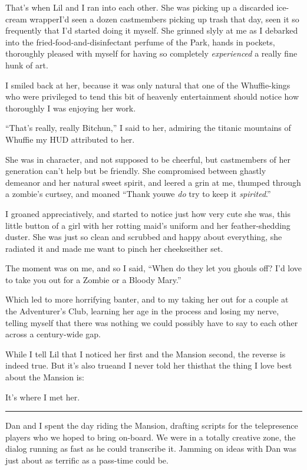 That's when Lil and I ran into each other. She was picking up a
discarded ice-cream wrapper{\dash}I'd seen a dozen castmembers picking up
trash that day, seen it so frequently that I'd started doing it
myself. She grinned slyly at me as I debarked into the
fried-food-and-disinfectant perfume of the Park, hands in pockets,
thoroughly pleased with myself for having so completely
\emph{experienced} a really fine hunk of art.

I smiled back at her, because it was only natural that one of the
Whuffie-kings who were privileged to tend this bit of heavenly
entertainment should notice how thoroughly I was enjoying her
work.

“That's really, really Bitchun,” I said to her, admiring the
titanic mountains of Whuffie my HUD attributed to her.

She was in character, and not supposed to be cheerful, but
castmembers of her generation can't help but be friendly. She
compromised between ghastly demeanor and her natural sweet spirit,
and leered a grin at me, thumped through a zombie's curtsey, and
moaned “Thank you{\dash}we \emph{do} try to keep it \emph{spirited}.”

I groaned appreciatively, and started to notice just how very cute
she was, this little button of a girl with her rotting maid's
uniform and her feather-shedding duster. She was just so clean and
scrubbed and happy about everything, she radiated it and made me
want to pinch her cheeks{\dash}either set.

The moment was on me, and so I said, “When do they let you ghouls
off? I'd love to take you out for a Zombie or a Bloody Mary.”

Which led to more horrifying banter, and to my taking her out for a
couple at the Adventurer's Club, learning her age in the process
and losing my nerve, telling myself that there was nothing we could
possibly have to say to each other across a century-wide gap.

While I tell Lil that I noticed her first and the Mansion second,
the reverse is indeed true. But it's also true{\dash}and I never told her
this{\dash}that the thing I love best about the Mansion is:

It's where I met her.

\begin{center}\rule{1in}{0.4pt}\end{center}

Dan and I spent the day riding the Mansion, drafting scripts for
the telepresence players who we hoped to bring on-board. We were in
a totally creative zone, the dialog running as fast as he could
transcribe it. Jamming on ideas with Dan was just about as terrific
as a pass-time could be.

